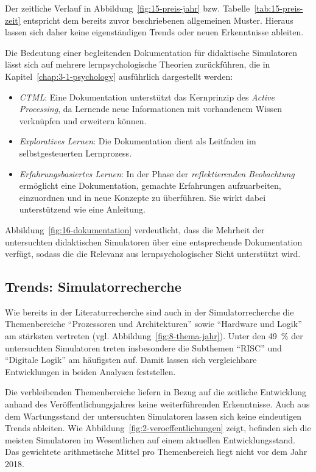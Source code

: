 Der zeitliche Verlauf in Abbildung~\ref{fig:15-preis-jahr} bzw. Tabelle~\ref{tab:15-preis-zeit} entspricht dem bereits zuvor beschriebenen allgemeinen Muster. Hieraus lassen sich daher keine eigenständigen Trends oder neuen Erkenntnisse ableiten.

Die Bedeutung einer begleitenden Dokumentation für didaktische Simulatoren lässt sich auf mehrere lernpsychologische Theorien zurückführen, die in Kapitel~\ref{chap:3-1-psychology} ausführlich dargestellt werden:

\begin{itemize}
    \item \textit{\ac{CTML}}: Eine Dokumentation unterstützt das Kernprinzip des \textit{Active Processing}, da Lernende neue Informationen mit vorhandenem Wissen verknüpfen und erweitern können.
    \item \textit{Exploratives Lernen}: Die Dokumentation dient als Leitfaden im selbstgesteuerten Lernprozess.
    \item \textit{Erfahrungsbasiertes Lernen}: In der Phase der \textit{reflektierenden Beobachtung} ermöglicht eine Dokumentation, gemachte Erfahrungen aufzuarbeiten, einzuordnen und in neue Konzepte zu überführen. Sie wirkt dabei unterstützend wie eine Anleitung.
\end{itemize}

Abbildung~\ref{fig:16-dokumentation} verdeutlicht, dass die Mehrheit der untersuchten didaktischen Simulatoren über eine entsprechende Dokumentation verfügt, sodass die die Relevanz aus lernpsychologischer Sicht unterstützt wird.

\subsection{Trends: Simulatorrecherche}

Wie bereits in der Literaturrecherche sind auch in der Simulatorrecherche die Themenbereiche \enquote{Prozessoren und Architekturen} sowie \enquote{Hardware und Logik} am stärksten vertreten (vgl. Abbildung~\ref{fig:8-thema-jahr}). Unter den 49~\% der untersuchten Simulatoren treten insbesondere die Subthemen \enquote{RISC} und \enquote{Digitale Logik} am häufigsten auf. Damit lassen sich vergleichbare Entwicklungen in beiden Analysen feststellen.

Die verbleibenden Themenbereiche liefern in Bezug auf die zeitliche Entwicklung anhand des Veröffentlichungsjahres keine weiterführenden Erkenntnisse. Auch aus dem Wartungsstand der untersuchten Simulatoren lassen sich keine eindeutigen Trends ableiten. Wie Abbildung~\ref{fig:2-veroeffentlichungen} zeigt, befinden sich die meisten Simulatoren im Wesentlichen auf einem aktuellen Entwicklungsstand. Das gewichtete arithmetische Mittel pro Themenbereich liegt nicht vor dem Jahr 2018.

